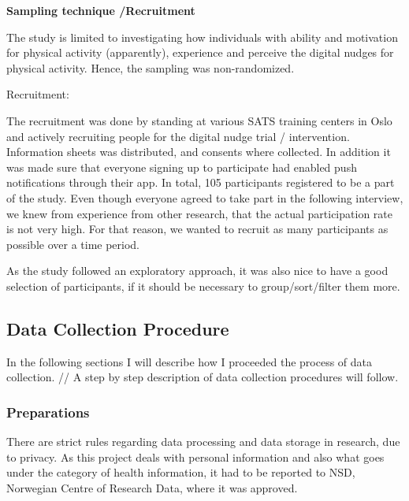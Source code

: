 \textbf{Sampling technique /Recruitment}
    
    The study is limited to investigating how individuals with ability and motivation for physical activity (apparently), experience and perceive the digital nudges for physical activity. Hence, the sampling was non-randomized.
    
    Recruitment: 
    
     The recruitment was done by standing at various SATS training centers in Oslo and actively recruiting people for the digital nudge trial / intervention. Information sheets was distributed, and consents where collected. In addition it was made sure that everyone signing up to participate had enabled push notifications through their app. In total, 105 participants registered to be a part of the study. Even though everyone agreed to take part in the following interview, we knew from experience from other research, that the actual participation rate is not very high. For that reason, we wanted to recruit as many participants as possible over a time period. 
        
    As the study followed an exploratory approach, it was also nice to have a good selection of participants, if it should be necessary to group/sort/filter them more.
    
    
    \subsection{Data Collection Procedure}
    In the following sections I will describe how I proceeded the process of data collection. // A step by step description of data collection procedures will follow. 
    
        \subsubsection{Preparations}
        
        There are strict rules regarding data processing and data storage in research, due to privacy. As this project deals with personal information and also what goes under the category of health information, it had to be reported to NSD, Norwegian Centre of Research Data, where it was approved. 


